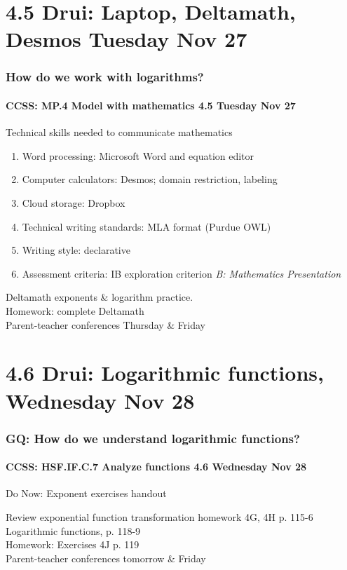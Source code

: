 \documentclass{beamer}
\begin{document}
    \section{4.5 Drui: Laptop, Deltamath, Desmos Tuesday Nov 27}
      \frame
      {
        \frametitle{How do we work with logarithms?}
        \framesubtitle{CCSS: MP.4 Model with mathematics  \alert{4.5 Tuesday Nov 27}}

        \begin{block}{Technical skills needed to communicate mathematics}
        \begin{enumerate}
            \item Word processing: Microsoft Word and equation editor
            \item Computer calculators: Desmos; domain restriction, labeling
            \item Cloud storage: Dropbox
            \item Technical writing standards: MLA format (Purdue OWL)
            \item Writing style: declarative
            \item Assessment criteria: IB exploration criterion \emph{B: Mathematics Presentation}
        \end{enumerate}
        \end{block}
        Deltamath exponents \& logarithm practice.\\
        Homework: complete Deltamath\\
        \alert{Parent-teacher conferences Thursday \& Friday}
        }

  \section{4.6 Drui: Logarithmic functions, Wednesday Nov 28}
    \frame
    {
      \frametitle{GQ: How do we understand logarithmic functions?}
      \framesubtitle{CCSS: HSF.IF.C.7 Analyze functions    \alert{4.6 Wednesday Nov 28}}

      \begin{block}{Do Now: Exponent exercises handout}
      \end{block}
      Review exponential function transformation homework 4G, 4H p. 115-6\\
      Logarithmic functions, p. 118-9\\ \bigskip
      Homework: Exercises 4J p. 119\\
      \alert{Parent-teacher conferences tomorrow \& Friday}
    }
\end{document}
